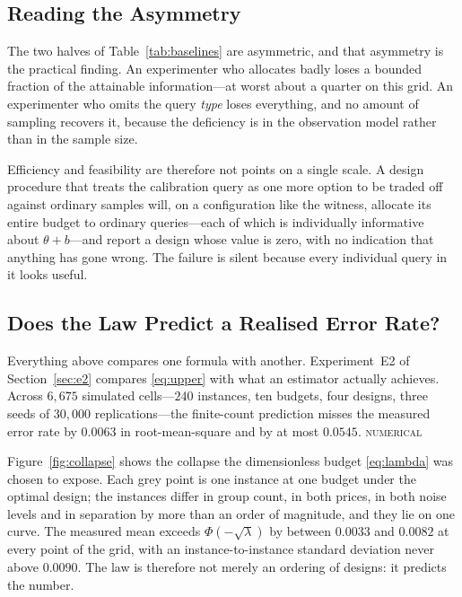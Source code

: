 \documentclass[conference]{IEEEtran}
\theoremstyle{definition}
\newcommand{\NUM}{\textsc{numerical}}
\begin{document}


\subsection{Reading the Asymmetry}

The two halves of Table~\ref{tab:baselines} are asymmetric, and that asymmetry is the
practical finding. An experimenter who allocates badly loses a bounded fraction of the
attainable information---at worst about a quarter on this grid. An experimenter who omits
the query \emph{type} loses everything, and no amount of sampling recovers it, because the
deficiency is in the observation model rather than in the sample size.

Efficiency and feasibility are therefore not points on a single scale. A design procedure
that treats the calibration query as one more option to be traded off against ordinary
samples will, on a configuration like the witness, allocate its entire budget to ordinary
queries---each of which is individually informative about $\theta+b$---and report a design
whose value is zero, with no indication that anything has gone wrong. The failure is silent
because every individual query in it looks useful.

\subsection{Does the Law Predict a Realised Error Rate?}
\label{sec:e2results}

Everything above compares one formula with another. Experiment~E2 of
Section~\ref{sec:e2} compares \eqref{eq:upper} with what an estimator actually achieves.
Across $6{,}675$ simulated cells---$240$ instances, ten budgets, four designs, three seeds of
$30{,}000$ replications---the finite-count prediction misses the measured error rate by
$0.0063$ in root-mean-square and by at most $0.0545$. \NUM{}

Figure~\ref{fig:collapse} shows the collapse the dimensionless budget \eqref{eq:lambda} was
chosen to expose. Each grey point is one instance at one budget under the optimal design;
the instances differ in group count, in both prices, in both noise levels and in separation
by more than an order of magnitude, and they lie on one curve. The measured mean exceeds
$\Phi(-\sqrt{\lambda})$ by between $0.0033$ and $0.0082$ at every point of the grid, with an
instance-to-instance standard deviation never above $0.0090$. The law is therefore not merely
an ordering of designs: it predicts the number.
\end{document}
